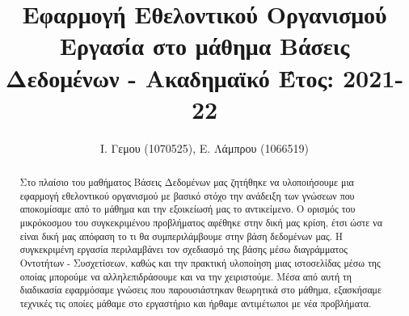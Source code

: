 \documentclass[manuscript,screen,review]{acmart}
\begin{document}
\title{Εφαρμογή Εθελοντικού Οργανισμού \\ Εργασία στο μάθημα Βάσεις Δεδομένων - Ακαδημαϊκό Έτος: 2021-22}





\author{Ι. Γεμου (1070525), Ε. Λάμπρου (1066519)}

\email{}


\begin{abstract}
Στο πλαίσιο του μαθήματος Βάσεις Δεδομένων μας ζητήθηκε να υλοποιήσουμε μια εφαρμογή εθελοντικού οργανισμού με βασικό στόχο την ανάδειξη των γνώσεων που αποκομίσαμε από το μάθημα και την εξοικείωσή μας το αντικείμενο. Ο ορισμός του μικρόκοσμου του συγκεκριμένου προβλήματος αφέθηκε στην δική μας κρίση, έτσι ώστε να είναι δική μας απόφαση το τι θα συμπεριλάμβουμε στην βάση δεδομένων μας. Η συγκεκριμένη εργασία  περιλαμβάνει τον σχεδιασμό της βάσης μέσω διαγράμματος
Οντοτήτων - Συσχετίσεων, καθώς και την πρακτική υλοποίηση μιας ιστοσελίδας μέσω της οποίας μπορούμε να αλληλεπιδράσουμε και να την χειριστούμε. Μέσα από αυτή τη διαδικασία εφαρμόσαμε γνώσεις που παρουσιάστηκαν θεωρητικά στο μάθημα, εξασκήσαμε
τεχνικές τις οποίες μάθαμε στο εργαστήριο και ήρθαμε αντιμέτωποι με νέα προβλήματα.
\end{abstract}

\end{document}
